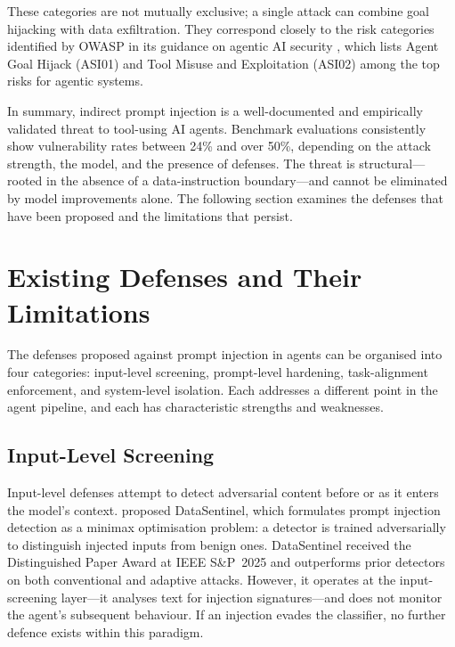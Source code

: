 \begin{justify}
These categories are not mutually exclusive; a single attack can combine goal hijacking with data exfiltration.  They correspond closely to the risk categories identified by OWASP in its guidance on agentic AI security \citep{owasp2026agentic}, which lists Agent Goal Hijack (ASI01) and Tool Misuse and Exploitation (ASI02) among the top risks for agentic systems.
\end{justify}

\begin{justify}
In summary, indirect prompt injection is a well-documented and empirically validated threat to tool-using AI agents.  Benchmark evaluations consistently show vulnerability rates between 24\% and over 50\%, depending on the attack strength, the model, and the presence of defenses.  The threat is structural---rooted in the absence of a data-instruction boundary---and cannot be eliminated by model improvements alone.  The following section examines the defenses that have been proposed and the limitations that persist.
\end{justify}


\section{Existing Defenses and Their Limitations}
\label{sec:existing_defenses}

\begin{justify}
The defenses proposed against prompt injection in agents can be organised into four categories: input-level screening, prompt-level hardening, task-alignment enforcement, and system-level isolation.  Each addresses a different point in the agent pipeline, and each has characteristic strengths and weaknesses.
\end{justify}

\subsection{Input-Level Screening}

\begin{justify}
Input-level defenses attempt to detect adversarial content before or as it enters the model's context.  \cite{liu2025datasentinel} proposed DataSentinel, which formulates prompt injection detection as a minimax optimisation problem: a detector is trained adversarially to distinguish injected inputs from benign ones.  DataSentinel received the Distinguished Paper Award at IEEE S\&P~2025 and outperforms prior detectors on both conventional and adaptive attacks.  However, it operates at the input-screening layer---it analyses text for injection signatures---and does not monitor the agent's subsequent behaviour.  If an injection evades the classifier, no further defence exists within this paradigm.
\end{justify}


